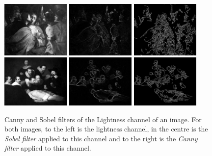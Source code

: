 \documentclass[11pt,a4paper,twoside,openright]{report}
\begin{document}
\begin{figure}[tbp]
\centering
\includegraphics[width=0.30\textwidth]{L_caravaggio_1962_139_1}
\includegraphics[width=0.30\textwidth]{sobel_L_caravaggio_1962_139_1}
\includegraphics[width=0.30\textwidth]{canny_L_caravaggio_1962_139_1}
\includegraphics[width=0.30\textwidth]{L_rembrandt_eu_464}
\includegraphics[width=0.30\textwidth]{sobel_L_rembrandt_eu_464}
\includegraphics[width=0.30\textwidth]{canny_L_rembrandt_eu_464}
\caption[Canny and Sobel filters of Lightness]{Canny and Sobel filters of the
Lightness channel of an image.  For both images, to the left is the lightness
channel, in the centre is the \emph{Sobel filter} applied to this channel and
to the right is the \emph{Canny filter} applied to this channel.}
\label{fig:cannysobell}
\end{figure}
\end{document}
